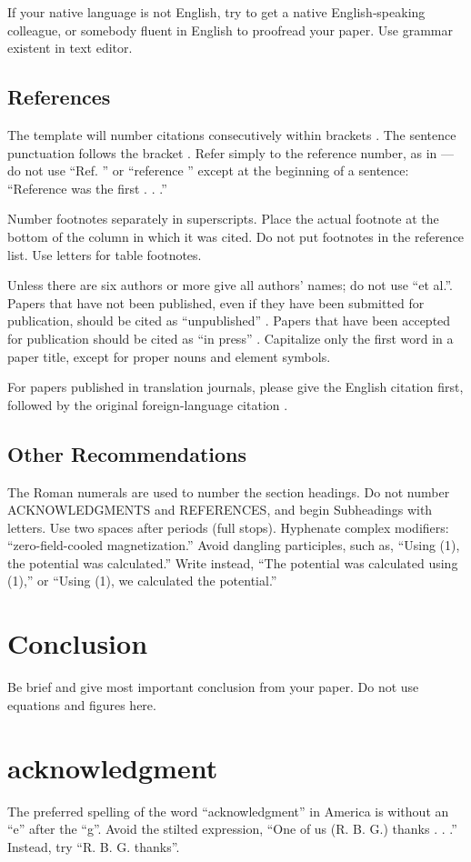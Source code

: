 \documentclass{MIPRO}
\begin{document}
If your native language is not English, try to get a native English‑speaking colleague, or somebody fluent in English to proofread your paper. Use grammar existent in text editor.

\subsection{References}

The template will number citations consecutively within brackets \cite{eason1955certain}. The sentence punctuation follows the bracket \cite{maxwell1873treatise}. Refer simply to the reference number, as in \cite{jacobs1963fine}—do not use “Ref. \cite{jacobs1963fine}” or “reference \cite{jacobs1963fine}” except at the beginning of a sentence: “Reference \cite{jacobs1963fine} was the first . . .”

Number footnotes separately in superscripts. Place the actual footnote at the bottom of the column in which it was cited. Do not put footnotes in the reference list. Use letters for table footnotes.

Unless there are six authors or more give all authors' names; do not use “et al.”. Papers that have not been published, even if they have been submitted for publication, should be cited as “unpublished” \cite{elissa}. Papers that have been accepted for publication should be cited as “in press” \cite{nicole}. Capitalize only the first word in a paper title, except for proper nouns and element symbols.

For papers published in translation journals, please give the English citation first, followed by the original foreign-language citation \cite{yorozu1987electron}.

\subsection{Other Recommendations}

The Roman numerals are used to number the section headings. Do not number ACKNOWLEDGMENTS and REFERENCES, and begin Subheadings with letters. Use two spaces after periods (full stops). Hyphenate complex modifiers: “zero-field-cooled magnetization.” Avoid dangling participles, such as, “Using (1), the potential was calculated.” Write instead, “The potential was calculated using (1),” or “Using (1), we calculated the potential.”

\section{Conclusion}
Be brief and give most important conclusion from your paper. Do not use equations and figures here.

\section*{acknowledgment}

The preferred spelling of the word “acknowledgment” in America is without an “e” after the “g”. Avoid the stilted expression, “One of us (R. B. G.) thanks . . .”  Instead, try “R. B. G. thanks”. 



\end{document}

